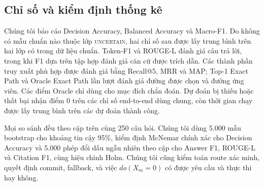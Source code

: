 \subsection{Chỉ số và kiểm định thống kê}

Chúng tôi báo cáo Decision Accuracy, Balanced Accuracy và Macro-F1. Do không có
mẫu chuẩn nào thuộc lớp \textsc{uncertain}, hai chỉ số sau được lấy trung bình
trên hai lớp có trong dữ liệu chuẩn. Token-F1 và ROUGE-L đánh giá câu trả lời,
trong khi F1 dựa trên tập hợp đánh giá căn cứ được trích dẫn. Các thành phần
truy xuất phù hợp được đánh giá bằng Recall@5, MRR và MAP; Top-1 Exact Path và
Oracle Exact Path lần lượt đánh giá đường được chọn và đường ứng viên. Các điểm
Oracle chỉ dùng cho mục đích chẩn đoán. Dự đoán bị thiếu hoặc thất bại nhận điểm
0 trên các chỉ số end-to-end dùng chung, còn thời gian chạy được lấy trung bình
trên các dự đoán thành công.

Mọi so sánh đều theo cặp trên cùng 250 câu hỏi. Chúng tôi dùng 5.000 mẫu
bootstrap cho khoảng tin cậy 95\%, kiểm định McNemar chính xác cho Decision
Accuracy và 5.000 phép đổi dấu ngẫu nhiên theo cặp cho Answer F1, ROUGE-L và
Citation F1, cùng hiệu chỉnh Holm. Chúng tôi cũng kiểm toán route xác minh,
quyết định commit, fallback, và việc $do(X_m=0)$ có được yêu cầu và thực thi hay
không.
